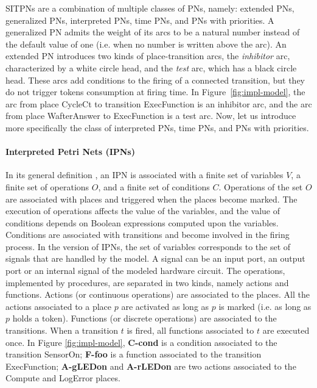 \documentclass[pdflatex,sn-mathphys]{sn-jnl}%
\theoremstyle{thmstyleone}%
\theoremstyle{thmstyletwo}%
\theoremstyle{thmstylethree}%
\begin{document}
SITPNs are a combination of multiple classes of PNs, namely: extended
PNs, generalized PNs, interpreted PNs, time PNs, and PNs with
priorities. A generalized PN admits the weight of its arcs to be a
natural number instead of the default value of one (i.e. when no
number is written above the arc). An extended PN introduces two kinds
of place-transition arcs, the \textit{inhibitor} arc, characterized by
a white circle head, and the \textit{test} arc, which has a black
circle head. These arcs add conditions to the firing of a connected
transition, but they do not trigger tokens consumption at firing
time. In Figure~\ref{fig:impl-model}, the arc from place CycleCt to
transition ExecFunction is an inhibitor arc, and the arc from place
WafterAnswer to ExecFunction is a test arc.  Now, let us introduce
more specifically the class of interpreted PNs, time PNs, and PNs with
priorities.

\paragraph{Interpreted Petri Nets (IPNs)}
In its general definition \cite{David1994}, an IPN is associated with
a finite set of variables $V$, a finite set of operations $O$, and a
finite set of conditions $C$. Operations of the set $O$ are associated
with places and triggered when the places become marked. The execution
of operations affects the value of the variables, and the value of
conditions depends on Boolean expressions computed upon the variables.
Conditions are associated with transitions and become involved in the
firing process.  In the \hilecop{} version of
IPNs, %
the set of variables corresponds to the set of \vhdl{} signals that
are handled by the model. A signal can be an input port, an output
port or an internal signal of the modeled hardware circuit. The
operations, implemented by \vhdl{} procedures, are separated in two
kinds, namely actions and functions. Actions (or continuous
operations) are associated to the places. All the actions associated
to a place $p$ are activated as long as $p$ is marked (i.e. as long as
$p$ holds a token). Functions (or discrete operations) are associated
to the transitions. When a transition $t$ is fired, all functions
associated to $t$ are executed once. In Figure \ref{fig:impl-model},
\textbf{C-cond} is a condition associated to the transition SensorOn;
\textbf{F-foo} is a function associated to the transition
ExecFunction; \textbf{A-gLEDon} and \textbf{A-rLEDon} are two actions
associated to the Compute and LogError places.
\end{document}
